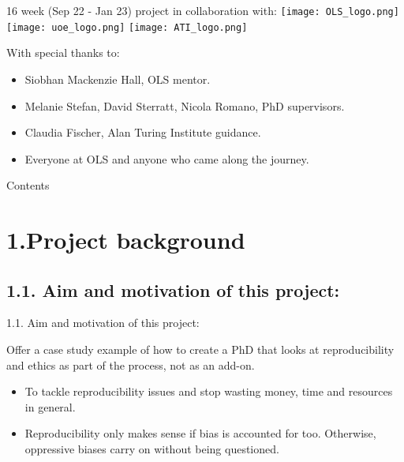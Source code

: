 \documentclass[t]{beamer}
\subtitle{Ethical standards and reproducibility of computer models in Neurobiology}
\date{19/01/2022}
\author{Susana Roman Garcia}
\begin{document}
\begin{frame}
	\titlepage
\end{frame}

\begin{frame}{16 week (Sep 22 - Jan 23) project in collaboration with:}
    \hfill \break
	\texttt{[image: OLS\_logo.png]}
        \texttt{[image: uoe\_logo.png]}
        \texttt{[image: ATI\_logo.png]}
\end{frame}

\begin{frame}{With special thanks to:}
    \begin{itemize}
        \item Siobhan Mackenzie Hall, OLS mentor.

        \item Melanie Stefan, David Sterratt, Nicola Romano, PhD supervisors.

        \item Claudia Fischer, Alan Turing Institute guidance.

        \item Everyone at OLS and anyone who came along the journey.
    \end{itemize}
\end{frame}

\begin{frame}{Contents}
	\tableofcontents
\end{frame}

\section{1.Project background}
\subsection{1.1. Aim and motivation of this project:}
\begin{frame}{1.1. Aim and motivation of this project:}
	\begin{block}{Offer a case study example of how to create a PhD that looks at reproducibility and ethics as part of the process, not as an add-on.}
        \hfill \break
  		\begin{itemize}    
  			\item To tackle reproducibility issues and stop wasting money, time and resources in general.
  			\item Reproducibility only makes sense if bias is accounted for too. Otherwise, oppressive biases carry on without being questioned.
  		\end{itemize}    
	\end{block}
\end{frame}
\end{document}
